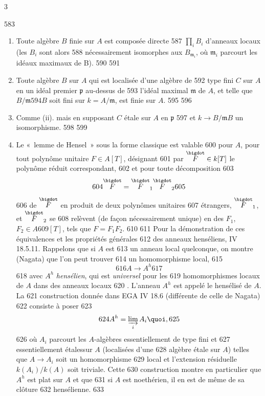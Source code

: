 3	\documentclass[10pt]{../fichiers-configuration-latex/smfart}
\begin{document}
   583	\begin{enumerate}
   584	\renewcommand{\theenumi}{\roman{enumi}}
   585	\renewcommand{\labelenumi}{(\theenumi)}
   586	\item Toute algèbre $B$ finie sur $A$ est composée directe
   587	$\prod_{i} B_i$ d'anneaux locaux (les $B_i$ sont alors
   588	nécessairement isomorphes aux $B_{\mathfrak{m}_i}$, où	$\mathfrak{m}_i$ parcourt les idéaux maximaux de B).
   590	
   591	\item  Toute algèbre $B$ sur $A$ qui est localisée d'une algèbre de
   592	  type fini $C$ sur $A$ en un idéal premier $\mathfrak{p}$ au-dessus de
   593	  l'idéal maximal $\mathfrak{m}$ de $A$, et telle que $B /\mathfrak{m}
   594	  B$ soit fini sur $k = A / \mathfrak{m}$, est finie sur $A$.
   595	
   596	\item Comme (ii). mais en supposant $C$ étale sur $A$ en $\mathfrak{p}$
   597	  et $k \to B /\mathfrak{m} B$ un isomorphisme.
   598	
   599	\item Le « lemme de Hensel » sous la forme classique est valable
   600	  pour $A$, \ie pour tout polynôme unitaire $F \in A [T]$, désignant
   601	  par $\overset{\bigdot}{F} \in k [T]$ le polynôme réduit correspondant,
   602	  et pour toute décomposition
   603	$$
   604	\overset{\bigdot}{F} = \overset{\bigdot}{F}_1 \overset{\bigdot}{F}_2
   605	$$
   606	de $\overset{\bigdot}{F}$ en produit de deux polynômes unitaires
   607	étrangers, $\overset{\bigdot}{F}_1$, et $\overset{\bigdot}{F}_2$ se
   608	relèvent (de façon nécessairement unique) en des $F_1$, $F_2 \in A
   609	[T]$, tels que $F = F_1 F_2$.
   610	
   611	Pour la démonstration de ces équivalences et les propriétés générales
   612	des anneaux henséliens, \cf \EGA IV 18.5.11. Rappelons que si $A$ est
   613	un anneau local quelconque, on montre (Nagata) que l'on peut trouver
   614	un homomorphisme local,
   615	$$
   616	A \to A^{h}
   617	$$
   618	avec $A^{h}$ \emph{hensélien}, qui est \emph{universel} pour les
   619	homomorphismes locaux de $A$ dans des anneaux locaux
   620	. L'anneau $A^h$ est appelé le hensélisé de $A$. La
   621	construction donnée dans EGA IV 18.6 (différente de celle de Nagata)
   622	consiste à poser
   623	$$
   624	A^h = \varinjlim_i A_i{\quoi},
   625	$$
   626	où $A_i$ parcourt les $A$-algèbres essentiellement de type fini et
   627	essentiellement étales\pageoriginale sur $A$ (\ie localisées d'une
   628	algèbre étale sur $A$) telles que $A \to A_i$ soit un homomorphisme
   629	local et l'extension résiduelle $k(A_i) / k(A)$ soit triviale. Cette
   630	construction montre en particulier que $A^h$ est plat sur $A$ et que
   631	si $A$ est noethérien, il en est de même de sa clôture
   632	hensélienne.
   633	\end{enumerate}
\end{document}
